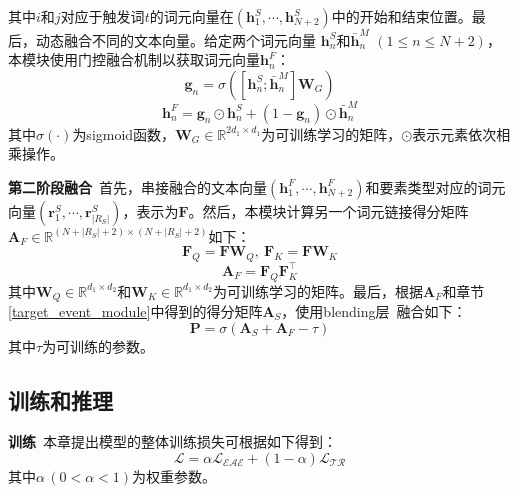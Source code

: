 其中$i$和$j$对应于触发词$t$的词元向量在$(\boldsymbol{h}_{1}^{S}, \cdots, \boldsymbol{h}_{N+2}^{S})$中的开始和结束位置。最后，动态融合不同的文本向量。给定两个词元向量 $\boldsymbol{h}_{n}^{S}$和$\boldsymbol{\bar{h}}_{n}^{M}$ $(1 \leq n \leq N+2)$，本模块使用门控融合机制以获取词元向量$\boldsymbol{h}_{n}^{F}$：
\begin{equation}
\boldsymbol{g}_{n}=\sigma\left(\left[\boldsymbol{h}_{n}^{S}; \boldsymbol{\bar{h}}_{n}^{M}\right]\boldsymbol{W}_{G}\right)
\end{equation} 
\begin{equation}
\boldsymbol{h}_{n}^{F} = \boldsymbol{g}_{n} \odot \boldsymbol{h}_{n}^{S} + \left(1-\boldsymbol{g}_{n}\right) \odot \boldsymbol{\bar{h}}_{n}^{M}
\end{equation} 
其中$\sigma(\cdot)$为sigmoid函数，$\boldsymbol{W}_{G} \in {\mathbb{R}}^{2d_{1} \times d_{1}}$为可训练学习的矩阵，$\odot$表示元素依次相乘操作。

\textbf{第二阶段融合}~首先，串接融合的文本向量$(\boldsymbol{h}_{1}^{F}, \cdots, \boldsymbol{h}_{N+2}^{F})$和要素类型对应的词元向量$(\boldsymbol{r}_{1}^{S}, \cdots, \boldsymbol{r}_{|R_{S}|}^{S})$，表示为$\boldsymbol{F}$。然后，本模块计算另一个词元链接得分矩阵$\boldsymbol{A}_{F} \in {\mathbb{R}}^{(N+|R_{S}|+2) \times (N+|R_{S}|+2)}$如下：
\begin{equation}
\boldsymbol{F}_{Q}=\boldsymbol{F} \boldsymbol{W}_{Q},~\boldsymbol{F}_{K}=\boldsymbol{F} \boldsymbol{W}_{K}
\end{equation} 
\begin{equation}
    \boldsymbol{A}_{F}=\boldsymbol{F}_{Q} \boldsymbol{F}_{K}^\top
\end{equation}
其中$\boldsymbol{W}_{Q} \in {\mathbb{R}}^{d_{1} \times d_{2}}$和$\boldsymbol{W}_{K} \in {\mathbb{R}}^{d_{1} \times d_{2}}$为可训练学习的矩阵。最后，根据$\boldsymbol{A}_{F}$和章节\ref{target_event_module}中得到的得分矩阵$\boldsymbol{A}_{S}$，使用blending层~\cite{wolpert1992stacked}融合如下：
\begin{equation}
\boldsymbol{P}=\sigma (\boldsymbol{A}_{S} + \boldsymbol{A}_{F} - \tau)
\end{equation} 
其中$\tau$为可训练的参数。

\subsection{训练和推理}
\textbf{训练}~本章提出模型的整体训练损失可根据如下得到：  
\begin{equation}
 \mathcal{L} = \alpha \mathcal{L_\textrm{EAE}} + (1-\alpha) \mathcal{L_\textrm{TR}}
 \label{overall_loss}
\end{equation}
其中$\alpha\,(0 < \alpha < 1)$为权重参数。

